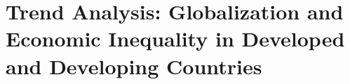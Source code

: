 \chapter{Trend Analysis: Globalization and Economic Inequality in Developed and Developing Countries}\label{chapter:trendsAnalysis}